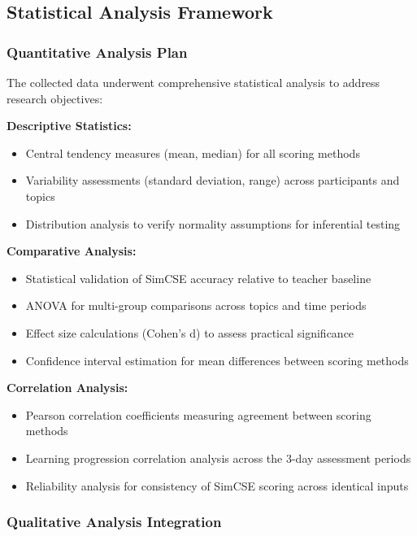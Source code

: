 {\subsection{Statistical Analysis Framework}

\subsubsection{Quantitative Analysis Plan}

The collected data underwent comprehensive statistical analysis to address research objectives:

\textbf{Descriptive Statistics:}
\begin{itemize}
    \item Central tendency measures (mean, median) for all scoring methods
    \item Variability assessments (standard deviation, range) across participants and topics
    \item Distribution analysis to verify normality assumptions for inferential testing
\end{itemize}

\textbf{Comparative Analysis:}
{\color{maroon}
\begin{itemize}
    \item Statistical validation of SimCSE accuracy relative to teacher baseline
    \item ANOVA for multi-group comparisons across topics and time periods
    \item Effect size calculations (Cohen's d) to assess practical significance
    \item Confidence interval estimation for mean differences between scoring methods
\end{itemize}
}

\textbf{Correlation Analysis:}
\begin{itemize}
    \item Pearson correlation coefficients measuring agreement between scoring methods
    \item Learning progression correlation analysis across the 3-day assessment periods
    \item Reliability analysis for consistency of SimCSE scoring across identical inputs
\end{itemize}

\subsubsection{Qualitative Analysis Integration}

}
